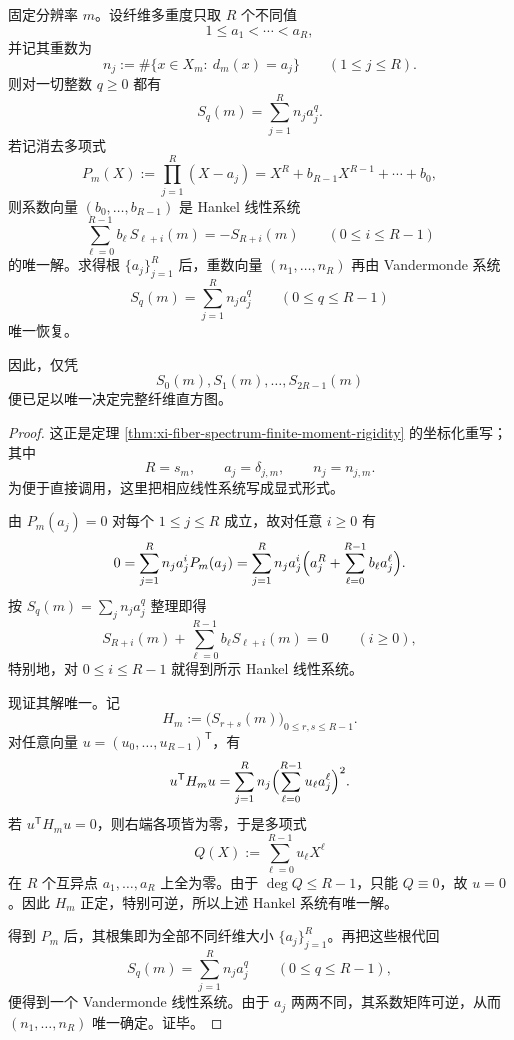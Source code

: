 \begin{corollary}\label{cor:xi-fiber-spectrum-hankel-vandermonde-explicit-recovery}
固定分辨率 \(m\)。设纤维多重度只取 \(R\) 个不同值
\[
1\le a_1<\cdots<a_R,
\]
并记其重数为
\[
n_j:=\#\{x\in X_m:\ d_m(x)=a_j\}
\qquad(1\le j\le R).
\]
则对一切整数 \(q\ge 0\) 都有
\[
S_q(m)=\sum_{j=1}^{R}n_j a_j^q.
\]
若记消去多项式
\[
P_m(X):=\prod_{j=1}^{R}(X-a_j)
=
X^R+b_{R-1}X^{R-1}+\cdots+b_0,
\]
则系数向量 \((b_0,\dots,b_{R-1})\) 是 Hankel 线性系统
\[
\sum_{\ell=0}^{R-1}b_\ell\,S_{\ell+i}(m)=-S_{R+i}(m)
\qquad(0\le i\le R-1)
\]
的唯一解。求得根 \(\{a_j\}_{j=1}^{R}\) 后，重数向量 \((n_1,\dots,n_R)\) 再由 Vandermonde 系统
\[
S_q(m)=\sum_{j=1}^{R}n_j a_j^q
\qquad(0\le q\le R-1)
\]
唯一恢复。

因此，仅凭
\[
S_0(m),S_1(m),\dots,S_{2R-1}(m)
\]
便已足以唯一决定完整纤维直方图。
\end{corollary}
\begin{proof}
这正是定理 \ref{thm:xi-fiber-spectrum-finite-moment-rigidity} 的坐标化重写；其中
\[
R=s_m,\qquad a_j=\delta_{j,m},\qquad n_j=n_{j,m}.
\]
为便于直接调用，这里把相应线性系统写成显式形式。

由 \(P_m(a_j)=0\) 对每个 \(1\le j\le R\) 成立，故对任意 \(i\ge 0\) 有
\[
0=\sum_{j=1}^{R}n_j a_j^i P_m(a_j)
=
\sum_{j=1}^{R}n_j a_j^i
\Bigl(a_j^R+\sum_{\ell=0}^{R-1}b_\ell a_j^\ell\Bigr).
\]
按 \(S_q(m)=\sum_j n_j a_j^q\) 整理即得
\[
S_{R+i}(m)+\sum_{\ell=0}^{R-1}b_\ell S_{\ell+i}(m)=0
\qquad(i\ge 0),
\]
特别地，对 \(0\le i\le R-1\) 就得到所示 Hankel 线性系统。

现证其解唯一。记
\[
H_m:=\bigl(S_{r+s}(m)\bigr)_{0\le r,s\le R-1}.
\]
对任意向量 \(u=(u_0,\dots,u_{R-1})^{\mathsf T}\)，有
\[
u^{\mathsf T}H_m u
=
\sum_{j=1}^{R}n_j\Bigl(\sum_{\ell=0}^{R-1}u_\ell a_j^\ell\Bigr)^2.
\]
若 \(u^{\mathsf T}H_m u=0\)，则右端各项皆为零，于是多项式
\[
Q(X):=\sum_{\ell=0}^{R-1}u_\ell X^\ell
\]
在 \(R\) 个互异点 \(a_1,\dots,a_R\) 上全为零。由于 \(\deg Q\le R-1\)，只能 \(Q\equiv 0\)，故 \(u=0\)。因此 \(H_m\) 正定，特别可逆，所以上述 Hankel 系统有唯一解。

得到 \(P_m\) 后，其根集即为全部不同纤维大小 \(\{a_j\}_{j=1}^{R}\)。再把这些根代回
\[
S_q(m)=\sum_{j=1}^{R}n_j a_j^q
\qquad(0\le q\le R-1),
\]
便得到一个 Vandermonde 线性系统。由于 \(a_j\) 两两不同，其系数矩阵可逆，从而 \((n_1,\dots,n_R)\) 唯一确定。证毕。
\end{proof}

